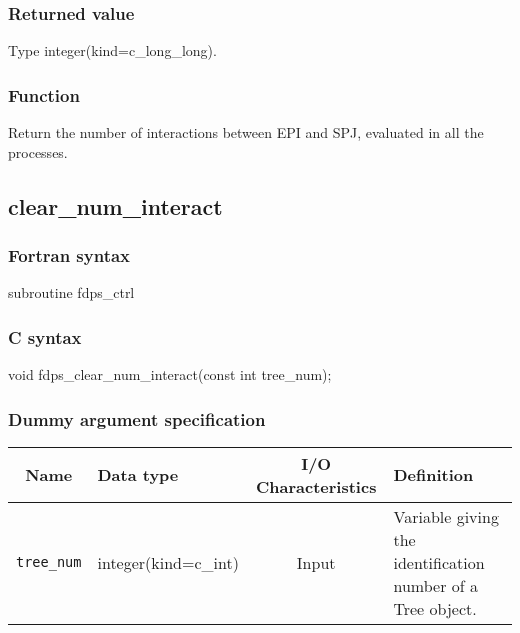\subsubsection*{Returned value}
Type integer(kind=c\_long\_long).

\subsubsection*{Function}
Return the number of interactions between EPI and SPJ, evaluated in all the processes.
\clearpage

\subsection{clear\_num\_interact}
\subsubsection*{Fortran syntax}
\begin{screen}
\begin{spverbatim}
subroutine fdps_ctrl%
\end{spverbatim}
\end{screen}

\subsubsection*{C syntax}
\begin{screen}
\begin{spverbatim}
void fdps_clear_num_interact(const int tree_num);
\end{spverbatim}
\end{screen}

\subsubsection*{Dummy argument specification}
\begin{table}[h]
\begin{tabularx}{\linewidth}{cXcX}
\toprule
\rowcolor{Snow2}
Name & Data type & I/O Characteristics & Definition \\
\midrule
\verb|tree_num|  & integer(kind=c\_int) & Input  & Variable giving the identification number of a Tree object. \\
\bottomrule
\end{tabularx}
\end{table}


